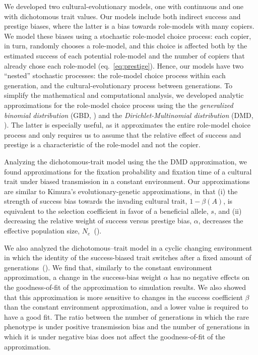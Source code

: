 \documentclass[12pt]{extarticle}
\begin{document}
We developed two cultural-evolutionary models, one with continuous and one with dichotomous trait values.
Our models include both indirect success and prestige biases, where the latter is a bias towards role-models with many copiers. We model these biases using a stochastic role-model choice process: each copier, in turn, randomly chooses a role-model, and this choice is affected both by the estimated success of each potential role-model and the number of copiers that already chose each role-model (eq.~\ref{eq:prestige}). 
Hence, our models have two ``nested'' stochastic processes: the role-model choice process within each generation, and the cultural-evolutionary process between generations.
To simplify the mathematical and computational analysis, we developed analytic approximations for the role-model choice process using the the {\em generalized binomial distribution} (GBD, ) and the {\em Dirichlet-Multinomial distribution} (DMD, ).
The latter is especially useful, as it approximates the entire role-model choice process and only requires us to assume that the relative effect of success and prestige is a characteristic of the role-model and not the copier.

Analyzing the dichotomous-trait model using the the DMD approximation, we found approximations for the fixation probability and fixation time of a cultural trait under biased transmission in a constant environment.
Our approximations are similar to Kimura's evolutionary-genetic approximations, in that (i) the strength of success bias towards the invading cultural trait, $1-\beta(A)$, is equivalent to the selection coefficient in favor of a beneficial allele, $s$, and (ii) decreasing the relative weight of success versus prestige bias, $\alpha$, decreases the effective population size, $N_e$~().

We also analyzed the dichotomous--trait model in a cyclic changing environment in which the identity of the success-biased trait switches after a fixed amount of generations~().
We find that, similarly to the constant environment approximation, a change in the success-bias weight $\alpha$ has no negative effects on the goodness-of-fit of the approximation to simulation results.
We also showed that this approximation is more sensitive to changes in the success coefficient $\beta$ than the constant environment approximation, and a lower value is required to have a good fit. The ratio between the number of {generations} in which the rare phenotype is under positive transmission bias and the number of generations in which it is under negative bias does not affect the goodness-of-fit of the approximation. 
\end{document}
